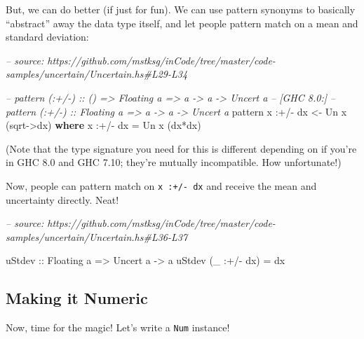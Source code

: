 \documentclass[]{article}
\newenvironment{Shaded}{}{}
\newcommand{\CommentTok}[1]{\textcolor[rgb]{0.38,0.63,0.69}{\textit{#1}}}
\newcommand{\DataTypeTok}[1]{\textcolor[rgb]{0.56,0.13,0.00}{#1}}
\newcommand{\FunctionTok}[1]{\textcolor[rgb]{0.02,0.16,0.49}{#1}}
\newcommand{\KeywordTok}[1]{\textcolor[rgb]{0.00,0.44,0.13}{\textbf{#1}}}
\newcommand{\NormalTok}[1]{#1}
\newcommand{\OtherTok}[1]{\textcolor[rgb]{0.00,0.44,0.13}{#1}}
\begin{document}
But, we can do better (if just for fun). We can use pattern synonyms to
basically ``abstract'' away the data type itself, and let people pattern match
on a mean and standard deviation:

\begin{Shaded}
\begin{Highlighting}[]
\CommentTok{-- source: https://github.com/mstksg/inCode/tree/master/code-samples/uncertain/Uncertain.hs#L29-L34}

\CommentTok{-- pattern (:+/-) :: () => Floating a => a -> a -> Uncert a}
\CommentTok{-- [GHC 8.0:]}
\CommentTok{-- pattern (:+/-) :: Floating a => a -> a -> Uncert a}
\NormalTok{pattern x }\FunctionTok{:+/-}\NormalTok{ dx }\OtherTok{<-} \DataTypeTok{Un}\NormalTok{ x (sqrt}\OtherTok{->}\NormalTok{dx)}
  \KeywordTok{where}
\NormalTok{    x }\FunctionTok{:+/-}\NormalTok{ dx }\FunctionTok{=} \DataTypeTok{Un}\NormalTok{ x (dx}\FunctionTok{*}\NormalTok{dx)}
\end{Highlighting}
\end{Shaded}

(Note that the type signature you need for this is different depending on if
you're in GHC 8.0 and GHC 7.10; they're mutually incompatible. How unfortunate!)

Now, people can pattern match on \texttt{x\ :+/-\ dx} and receive the mean and
uncertainty directly. Neat!

\begin{Shaded}
\begin{Highlighting}[]
\CommentTok{-- source: https://github.com/mstksg/inCode/tree/master/code-samples/uncertain/Uncertain.hs#L36-L37}

\OtherTok{uStdev ::} \DataTypeTok{Floating}\NormalTok{ a }\OtherTok{=>} \DataTypeTok{Uncert}\NormalTok{ a }\OtherTok{->}\NormalTok{ a}
\NormalTok{uStdev (_ }\FunctionTok{:+/-}\NormalTok{ dx) }\FunctionTok{=}\NormalTok{ dx}
\end{Highlighting}
\end{Shaded}

\hypertarget{making-it-numeric}{%
\subsection{Making it Numeric}\label{making-it-numeric}}

Now, time for the magic! Let's write a \texttt{Num} instance!
\end{document}
